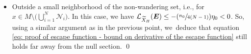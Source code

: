 \documentclass[11pt]{article}
\newcommand{\ie}{i.e.,\xspace}
\newcommand{\ro}{\mathrm{o}}
\newcommand{\rs}{\mathrm{s}}
\newcommand{\ru}{\mathrm{u}}
\newcommand{\Psfrac}[2]{(\sfrac{#1}{#2})}
\theoremstyle{definition}
\theoremstyle{plain}
\newcommand{\Lie}{\mathcal{L}}
\newcommand{\Ncal}{\mathcal{N}}
\newcommand{\w}[1]{\langle {#1} \rangle}
\DeclareMathOperator{\Cone}{Cone}
\DeclareMathOperator{\E}{\boldsymbol{E}}
\begin{document}
\begin{itemize}
\[
\Lie_{X_H} (G_m) = \Lie_{\widetilde{X}_H} (\E) \log \w{ |\xi| C_1} + C_2.
\]
Moreover, according to the construction of $\E$, one can find a positive constant $\eta > 0$ such that $ \Lie_{\widetilde{X}_H} (\E) (x,\tilde{\xi}) < - \eta < 0$. Therefore, there exists a positive radius $R > 0$ such that, for every $(x,\xi)$ in the set $T^*M \setminus \left(\Cone (\Ncal^\rs) \cup \Cone (\Ncal^\ro) \cup \Cone (\Ncal^\ru) \right)$ with $x \in \bigcup_{1 \leq i \leq N} \Ncal_i$ and $|\xi| \geq R$, we~have
\begin{equation}\label{eq: proof of escape function - bound on derivative of the escape function}
\Lie_{X_H} (G_m) \leq - \gamma \min(s, |u|).
\end{equation}
Therefore, we~define $C_m:= \gamma \min(s, |u|) $.
\item Outside a small neighborhood of the non-wandering set, \ie for $x \!\in\! M\!\setminus\! \bigl(\bigcup_{i = 1}^N \Ncal_i \bigr)$. In this case, we have $ \Lie_{\widetilde{X}_H} (\E) \leq - \Psfrac{n_0}{4 (N-1)}\eta_0 < 0$. So, using a similar argument as in the previous point, we~deduce that equation \eqref{eq: proof of escape function - bound on derivative of the escape function} still holds far away from the null section. \qed
\end{itemize}
\end{document}
